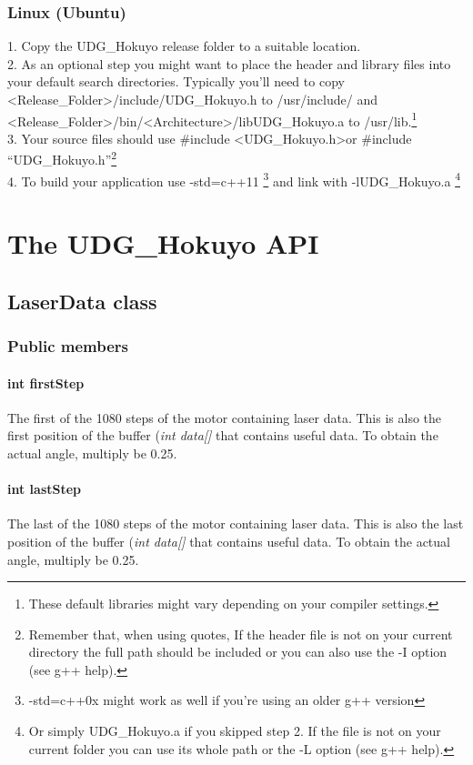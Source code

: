 \documentclass{book}
\begin{document}
\subsection{Linux (Ubuntu)}
1. Copy the UDG\_Hokuyo release folder to a suitable location.\\
2. As an optional step you might want to place the header and library files into your default search directories. Typically you'll need to copy \textless{}Release\_Folder\textgreater{}/include/UDG\_Hokuyo.h to /usr/include/ and \textless{}Release\_Folder\textgreater{}/bin/\textless{}Architecture\textgreater{}/libUDG\_Hokuyo.a to /usr/lib.\footnote{These default libraries might vary depending on your compiler settings.}\\
3. Your source files should use \#include \textless UDG\_Hokuyo.h\textgreater or \#include ``UDG\_Hokuyo.h''\footnote{Remember that, when using quotes, If the header file is not on your current directory the full path should be included or you can also use the -I option (see g++ help).}\\
4. To build your application use -std=c++11 \footnote{ -std=c++0x might work as well if you're using an older g++ version} and link with -lUDG\_Hokuyo.a \footnote{Or simply UDG\_Hokuyo.a if you skipped step 2. If the file is not on your current folder you can use its whole path or the -L option (see g++ help).}

\chapter{The UDG\_Hokuyo API}
\section{LaserData class}
\subsection*{Public members}

\subsubsection{int firstStep}
The first of the 1080 steps of the motor containing laser data. This is also the first position of the buffer (\textit{int data[]} that contains useful data. To obtain the actual angle, multiply be 0.25.\\

\subsubsection{int lastStep}
The last of the 1080 steps of the motor containing laser data. This is also the last position of the buffer (\textit{int data[]} that contains useful data. To obtain the actual angle, multiply be 0.25.\\
\end{document}
